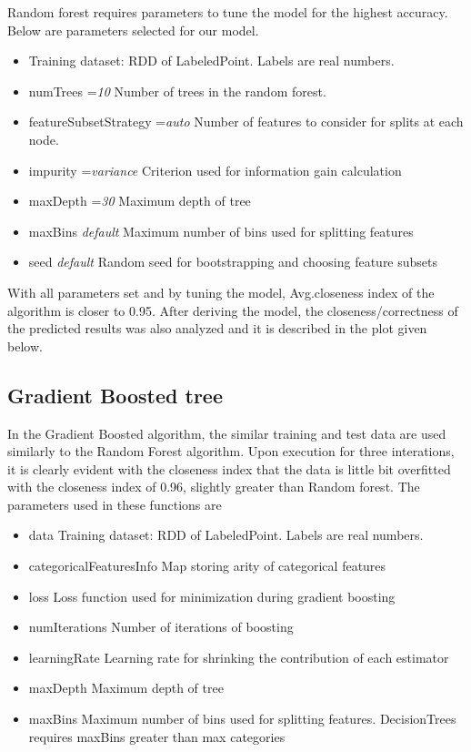 \documentclass[sigconf]{acmart}
\begin{document}
Random forest requires parameters to tune the model for the highest accuracy. Below are parameters selected for our model.
\begin{itemize}
\item Training dataset: RDD of LabeledPoint. Labels are real numbers.
\item numTrees ={\em 10}   Number of trees in the random forest.
\item featureSubsetStrategy ={\em auto}   Number of features to consider for splits at each node.
\item impurity ={\em variance }  Criterion used for information gain calculation 
\item maxDepth ={\em 30 }  Maximum depth of tree
\item maxBins {\em default }   Maximum number of bins used for splitting features
\item seed {\em default }   Random seed for bootstrapping and choosing feature subsets
\end{itemize}

With all parameters set and by tuning the model, Avg.closeness index of the algorithm is closer to 0.95. After deriving the model, the closeness/correctness of the predicted results was also analyzed and it is described in the plot given below.

\subsection{Gradient Boosted tree}
In the Gradient Boosted algorithm, the similar training and test data are used similarly to the Random Forest algorithm. Upon execution for three interations, it is clearly evident with the closeness index that the data is little bit overfitted with the closeness index of 0.96, slightly greater than Random forest.
The parameters used in these functions are 
\begin{itemize}
\item data  Training dataset: RDD of LabeledPoint. Labels are real numbers.
\item categoricalFeaturesInfo  Map storing arity of categorical features
\item loss  Loss function used for minimization during gradient boosting
\item numIterations  Number of iterations of boosting
\item learningRate  Learning rate for shrinking the contribution of each estimator
\item maxDepth  Maximum depth of tree 
\item maxBins  Maximum number of bins used for splitting features. DecisionTrees requires maxBins greater than max categories
\end{itemize}
\end{document}
